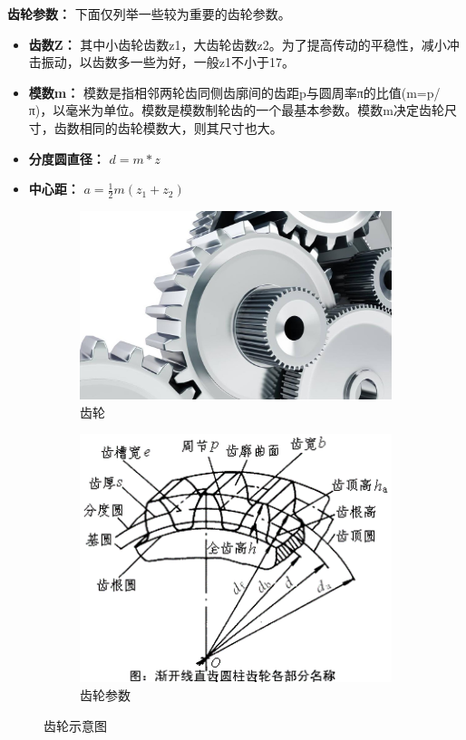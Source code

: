 \documentclass[UTF8]{article} %
\begin{document}
\textbf{齿轮参数：} 下面仅列举一些较为重要的齿轮参数。
\begin{itemize}
  \item \textbf{齿数Z：} 其中小齿轮齿数z1，大齿轮齿数z2。为了提高传动的平稳性，减小冲击振动，以齿数多一些为好，一般z1不小于17。
  \item \textbf{模数m：} 模数是指相邻两轮齿同侧齿廓间的齿距p与圆周率π的比值(m=p/π)，以毫米为单位。模数是模数制轮齿的一个最基本参数。模数m决定齿轮尺寸，齿数相同的齿轮模数大，则其尺寸也大。
  \item \textbf{分度圆直径：} $d=m*z$
  \item \textbf{中心距：} $a=\frac{1}{2}m(z_1+z_2)$
\end{itemize}

\begin{figure}[H]
  \centering
  \begin{subfigure}[b]{0.4\textwidth}
         \centering
         \includegraphics[width=\textwidth]{cl1.jpg}
          \caption{齿轮}
  \end{subfigure}
  \quad
  \begin{subfigure}[b]{0.33\textwidth}
          \centering
          \includegraphics[width=\textwidth]{cl2.png}
          \caption{齿轮参数}
  \end{subfigure}
  \caption{齿轮示意图}
\end{figure}
\end{document}
